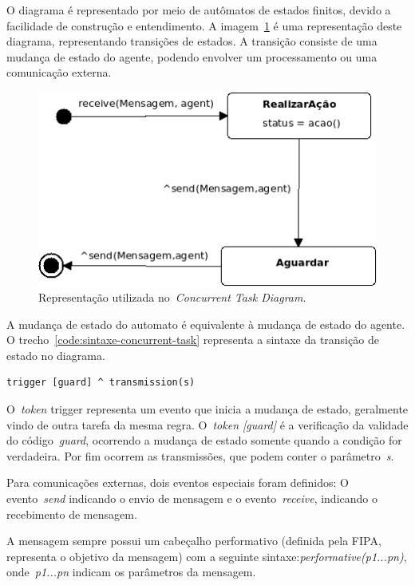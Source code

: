 O diagrama é representado por meio de autômatos de estados finitos, devido a facilidade de construção e entendimento. A imagem~\ref{fig:examplo-diagrama-tarefas-concorrentes} é uma representação deste diagrama, representando transições de estados. A transição consiste de uma mudança de estado do agente, podendo envolver um processamento ou uma comunicação externa.
\begin{figure}
	\centering
	\includegraphics[scale=0.65]{images/examplo-diagrama-tarefas-concorrentes.png}
	\caption{Representação utilizada no~\emph{Concurrent Task Diagram}.}
	\label{fig:examplo-diagrama-tarefas-concorrentes}
\end{figure}

A mudança de estado do automato é equivalente à mudança de estado do agente. O trecho~\ref{code:sintaxe-concurrent-task} representa a sintaxe da transição de estado no diagrama.

\begin{lstlisting}[label=code:sintaxe-concurrent-task,caption=Sintaxe da mudança de estado.]
	trigger [guard] ^ transmission(s)
\end{lstlisting}

O~\emph{token} trigger representa um evento que inicia a mudança de estado, geralmente vindo de outra tarefa da mesma regra. O~\emph{token [guard]} é a verificação da validade do código~\emph{guard}, ocorrendo a mudança de estado somente quando a condição for verdadeira. Por fim ocorrem as transmissões, que podem conter o parâmetro~\emph{s}.

Para comunicações externas, dois eventos especiais foram definidos: O evento~\emph{send} indicando o envio de mensagem e o evento~\emph{receive}, indicando o recebimento de mensagem.

A mensagem sempre possui um cabeçalho performativo (definida pela FIPA, representa o objetivo da mensagem) com a seguinte sintaxe:\emph{performative(p1...pn)}, onde~\emph{p1...pn} indicam os parâmetros da mensagem.

